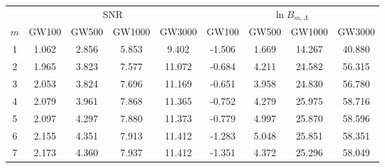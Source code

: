 \begin{table}[t]
\begin{ruledtabular}
\begin{tabular}{c|cccc|cccc}
& \multicolumn{4}{c|}{SNR}
& \multicolumn{4}{c}{$\ln B_{m,\Lambda}$}
\\
$m$
& GW100 & GW500 & GW1000 & GW3000
& GW100 & GW500 & GW1000 & GW3000
\\
\hline
1 & 1.062 & 2.856 & 5.853 & 9.402 & -1.506 & 1.669 & 14.267 & 40.880\\
2 & 1.965 & 3.823 & 7.577 & 11.072 & -0.684 & 4.211 & 24.582 & 56.315\\
3 & 2.053 & 3.824 & 7.696 & 11.169 & -0.651 & 3.958 & 24.830 & 56.780\\
4 & 2.079 & 3.961 & 7.868 & 11.365 & -0.752 & 4.279 & 25.975 & 58.716\\
5 & 2.097 & 4.297 & 7.880 & 11.373 & -0.779 & 4.997 & 25.870 & 58.596\\
6 & 2.155 & 4.351 & 7.913 & 11.412 & -1.283 & 5.048 & 25.851 & 58.351\\
7 & 2.173 & 4.360 & 7.937 & 11.412 & -1.351 & 4.372 & 25.296 & 58.049\\
\end{tabular}
\end{ruledtabular}
\end{table}
